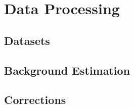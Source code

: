 \chapter{Data Processing}
\label{ch3}

\section{Datasets}

\section{Background Estimation}

\section{Corrections}

